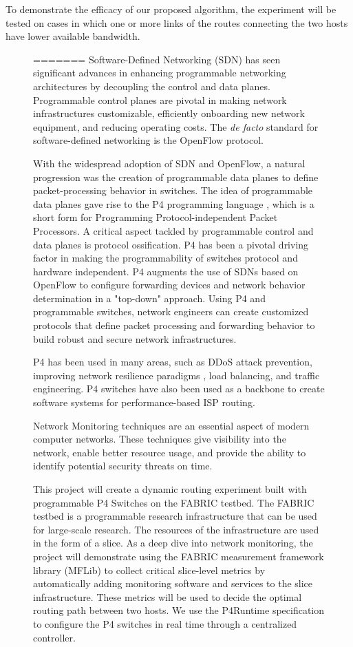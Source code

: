 \documentclass[conference]{IEEEtran}
\begin{document}
    To demonstrate the efficacy of our proposed algorithm, the experiment will be tested on cases in which one or more links of the routes connecting the two hosts have lower available bandwidth.
    \begin{figure}[h!]
=======
    Software-Defined Networking (SDN) has seen significant advances in enhancing programmable networking architectures by decoupling the control and data planes. Programmable control planes are pivotal in making network infrastructures customizable, efficiently onboarding new network equipment, and reducing operating costs. The \textit{de facto} standard for software-defined networking is the OpenFlow protocol.

    With the widespread adoption of SDN and OpenFlow, a natural progression was the creation of programmable data planes to define packet-processing behavior in switches. The idea of programmable data planes gave rise to the P4 programming language \cite{b1}, which is a short form for Programming Protocol-independent Packet Processors. A critical aspect tackled by programmable control and data planes is protocol ossification. P4 has been a pivotal driving factor in making the programmability of switches protocol and hardware independent. P4 augments the use of SDNs based on OpenFlow to configure forwarding devices and network behavior determination in a "top-down" approach. Using P4 and programmable switches, network engineers can create customized protocols that define packet processing and forwarding behavior to build robust and secure network infrastructures.

    P4 has been used in many areas, such as DDoS attack prevention, improving network resilience paradigms \cite{b2}, load balancing, and traffic engineering. P4 switches have also been used as a backbone to create software systems for performance-based ISP routing.

    Network Monitoring techniques are an essential aspect of modern computer networks. These techniques give visibility into the network, enable better resource usage, and provide the ability to identify potential security threats on time.

    This project will create a dynamic routing experiment built with programmable P4 Switches on the FABRIC testbed. The FABRIC testbed is a programmable research infrastructure that can be used for large-scale research. The resources of the infrastructure are used in the form of a slice. As a deep dive into network monitoring, the project will demonstrate using the FABRIC measurement framework library (MFLib) \cite{b3} to collect critical slice-level metrics by automatically adding monitoring software and services to the slice infrastructure. These metrics will be used to decide the optimal routing path between two hosts. We use the P4Runtime specification to configure the P4 switches in real time through a centralized controller.


\end{figure}
\end{document}

